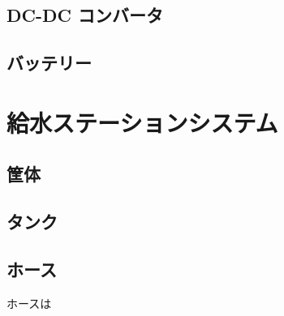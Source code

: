 \subsection{DC-DC コンバータ}
\subsection{バッテリー}

\section{給水ステーションシステム}

\subsection{筐体}

\subsection{タンク}

\subsection{ホース}
ホースは
